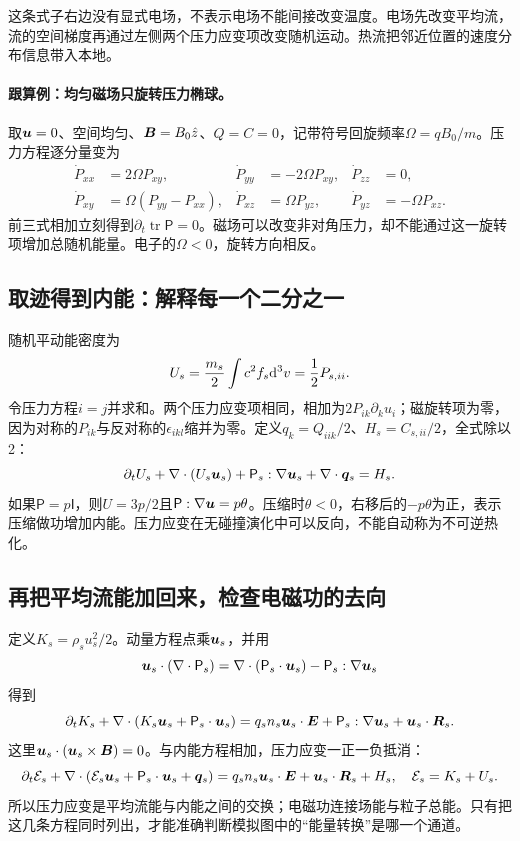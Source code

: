 这条式子右边没有显式电场，不表示电场不能间接改变温度。电场先改变平均流，流的空间梯度再通过左侧两个压力应变项改变随机运动。热流把邻近位置的速度分布信息带入本地。

\paragraph{跟算例：均匀磁场只旋转压力椭球。}
取$\bm{u}=0$、空间均匀、$\bm{B}=B_0\hat z$、$Q=C=0$，记带符号回旋频率$\Omega=qB_0/m$。压力方程逐分量变为
\begin{align}
 \dot P_{xx}&=2\Omega P_{xy},&
 \dot P_{yy}&=-2\Omega P_{xy},&
 \dot P_{zz}&=0,\\
 \dot P_{xy}&=\Omega(P_{yy}-P_{xx}),&
 \dot P_{xz}&=\Omega P_{yz},&
 \dot P_{yz}&=-\Omega P_{xz}.
\end{align}
前三式相加立刻得到$\partial_t\operatorname{tr}\mathsf P=0$。磁场可以改变非对角压力，却不能通过这一旋转项增加总随机能量。电子的$\Omega<0$，旋转方向相反。

\subsection{取迹得到内能：解释每一个二分之一}
随机平动能密度为
\begin{equation}
 U_s={m_s\over2}\int c^2f_s\mathrm d^3v={1\over2}P_{s,ii}.
\end{equation}
令压力方程$i=j$并求和。两个压力应变项相同，相加为$2P_{ik}\partial_ku_i$；磁旋转项为零，因为对称的$P_{ik}$与反对称的$\epsilon_{ikl}$缩并为零。定义$q_k=Q_{iik}/2$、$H_s=C_{s,ii}/2$，全式除以2：
\begin{equation}
 \partial_tU_s+\nabla\cdot(U_s\bm{u}_s)
 +\mathsf P_s:\nabla\bm{u}_s+\nabla\cdot\bm{q}_s=H_s.
 \label{eq:internal}
\end{equation}
如果$\mathsf P=p\mathsf I$，则$U=3p/2$且$\mathsf P:\nabla\bm{u}=p\theta$。压缩时$\theta<0$，右移后的$-p\theta$为正，表示压缩做功增加内能。压力应变在无碰撞演化中可以反向，不能自动称为不可逆热化。

\subsection{再把平均流能加回来，检查电磁功的去向}
定义$K_s=\rho_su_s^2/2$。动量方程点乘$\bm{u}_s$，并用
\begin{equation}
 \bm{u}_s\cdot(\nabla\cdot\mathsf P_s)
 =\nabla\cdot(\mathsf P_s\cdot\bm{u}_s)-\mathsf P_s:\nabla\bm{u}_s
\end{equation}
得到
\begin{equation}
 \partial_tK_s+\nabla\cdot(K_s\bm{u}_s+\mathsf P_s\cdot\bm{u}_s)
 =q_sn_s\bm{u}_s\cdot\bm{E}+\mathsf P_s:\nabla\bm{u}_s+\bm{u}_s\cdot\bm{R}_s.
\end{equation}
这里$\bm{u}_s\cdot(\bm{u}_s\times\bm{B})=0$。与内能方程相加，压力应变一正一负抵消：
\begin{equation}
 \partial_t\mathcal E_s+
 \nabla\cdot(\mathcal E_s\bm{u}_s+\mathsf P_s\cdot\bm{u}_s+\bm{q}_s)
 =q_sn_s\bm{u}_s\cdot\bm{E}+\bm{u}_s\cdot\bm{R}_s+H_s,
 \quad\mathcal E_s=K_s+U_s.
 \label{eq:energy}
\end{equation}
所以压力应变是平均流能与内能之间的交换；电磁功连接场能与粒子总能。只有把这几条方程同时列出，才能准确判断模拟图中的“能量转换”是哪一个通道。


